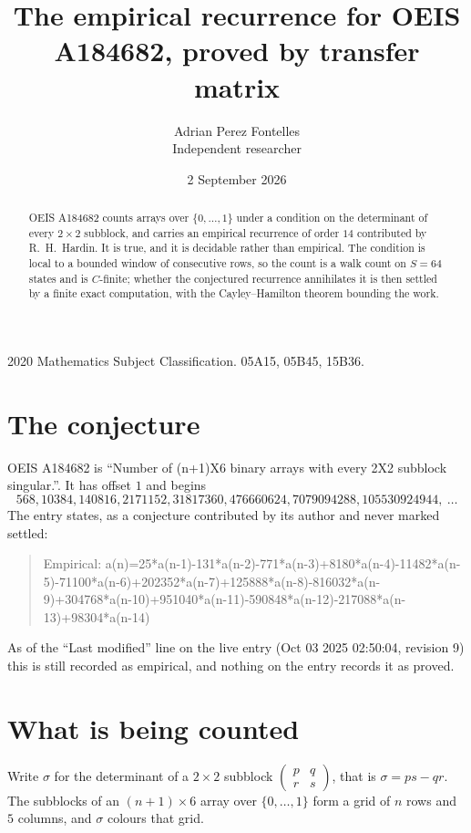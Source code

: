 \documentclass[11pt,a4paper]{article}
\title{The empirical recurrence for OEIS A184682, proved by transfer matrix}
\author{Adrian Perez Fontelles\\ \small Independent researcher}
\date{2 September 2026}
\theoremstyle{plain}
\theoremstyle{definition}
\begin{document}
\maketitle

\begin{abstract}
OEIS A184682 counts arrays over $\{0,\dots,1\}$ under a condition on the determinant of every
$2\times2$ subblock, and carries an empirical recurrence of order $14$ contributed by
R.~H.~Hardin. It is true, and it is decidable rather than empirical. The condition is local to
a bounded window of consecutive rows, so the count is a walk count on $S=64$ states and is
$C$-finite; whether the conjectured recurrence annihilates it is then settled by a finite exact
computation, with the Cayley--Hamilton theorem bounding the work.
\end{abstract}

\noindent\small 2020 Mathematics Subject Classification. 05A15, 05B45, 15B36.\normalsize

\section{The conjecture}

OEIS A184682 is ``Number of (n+1)X6 binary arrays with every 2X2 subblock singular.''. It has offset $1$ and begins
\[
568, 10384, 140816, 2171152, 31817360, 476660624, 7079094288, 105530924944,\ \dots
\]
The entry states, as a conjecture contributed by its author and never marked settled:
\begin{quote}
Empirical: a(n)=25*a(n-1)-131*a(n-2)-771*a(n-3)+8180*a(n-4)-11482*a(n-5)-71100*a(n-6)+202352*a(n-7)+125888*a(n-8)-816032*a(n-9)+304768*a(n-10)+951040*a(n-11)-590848*a(n-12)-217088*a(n-13)+98304*a(n-14)
\end{quote}
As of the ``Last modified'' line on the live entry (Oct 03 2025 02:50:04, revision 9) this is still
recorded as empirical, and nothing on the entry records it as proved.

\section{What is being counted}

Write $\sigma$ for the determinant of a $2\times2$ subblock
$\begin{pmatrix}p&q\\r&s\end{pmatrix}$, that is $\sigma=ps-qr$. The subblocks of an
$(n+1)\times6$ array over $\{0,\dots,1\}$ form a grid of $n$ rows and $5$
columns, and $\sigma$ colours that grid.
\end{document}
